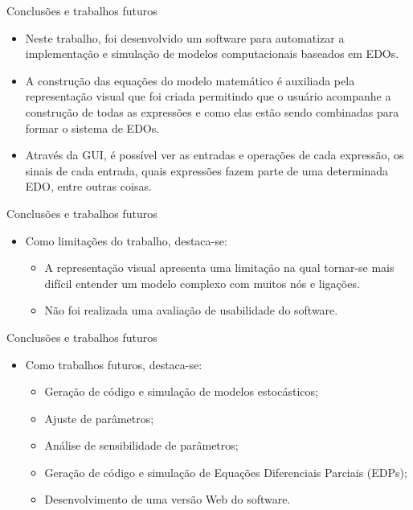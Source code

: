 \begin{frame}{Conclusões e trabalhos futuros}
    \begin{itemize}
        \item Neste trabalho, foi desenvolvido um software para automatizar a implementação e simulação de modelos computacionais baseados em EDOs.
        \item A construção das equações do modelo matemático é auxiliada pela representação visual que foi criada permitindo que o usuário acompanhe a construção de todas as expressões e como elas estão sendo combinadas para formar o sistema de EDOs.
        \item Através da GUI, é possível ver as entradas e operações de cada expressão, os sinais de cada entrada, quais expressões fazem parte de uma determinada EDO, entre outras coisas. 
    \end{itemize}
\end{frame}

\begin{frame}{Conclusões e trabalhos futuros}
    \begin{itemize}
        \item Como limitações do trabalho, destaca-se: 
        \begin{itemize}
            \item A representação visual apresenta uma limitação na qual tornar-se mais difícil entender um modelo complexo com muitos nós e ligações. 
            \item Não foi realizada uma avaliação de usabilidade do software. 
        \end{itemize}
    \end{itemize}
\end{frame}

\begin{frame}{Conclusões e trabalhos futuros}
    \begin{itemize}
        \item Como trabalhos futuros, destaca-se: 
        \begin{itemize}
            \item Geração de código e simulação de modelos estocásticos;
            \item Ajuste de parâmetros; 
            \item Análise de sensibilidade de parâmetros;
            \item Geração de código e simulação de Equações Diferenciais Parciais (EDPs);
            \item Desenvolvimento de uma versão Web do software. 
        \end{itemize}
    \end{itemize}
\end{frame}